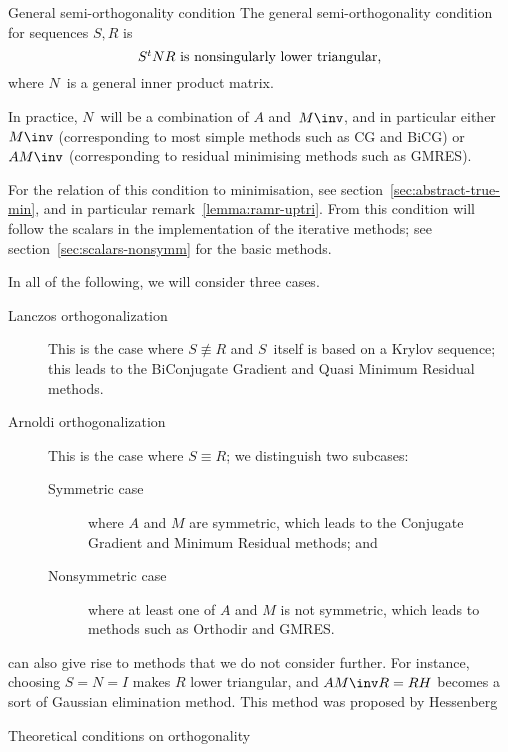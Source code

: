 \documentclass[11pt]{artikel3}
\begin{document}
\begin{Outline}
\begin{ddefinition}{General semi-orthogonality condition}
The general semi-orthogonality condition for sequences $S,R$ is
\begin{equation} \hbox{$S^tN R$ is nonsingularly lower triangular,}
    \label{eq:cond-ortho}\end{equation}
where $N$~is a general inner product matrix.
\end{ddefinition}

In practice, $N$~will be a combination of $A$
and~$M\inv$, and in particular either $M\inv$ (corresponding to
most simple methods such as CG and BiCG) 
or~$AM\inv$ (corresponding to residual minimising methods such as GMRES).

For the relation of this condition to minimisation,
see section~\ref{sec:abstract-true-min}, and in particular 
remark~\ref{lemma:ramr-uptri}. From this condition will follow the
scalars in the implementation of the iterative methods; see
section~\ref{sec:scalars-nonsymm} for the basic methods.

In all of the following, we will consider three cases.
\begin{description}
\item[Lanczos orthogonalization] This is the case where $S\not\equiv R$
and $S$~itself is based on a Krylov sequence;
this leads to the BiConjugate Gradient and Quasi Minimum Residual methods.
\item[Arnoldi orthogonalization] This is the case where $S\equiv R$;
we distinguish two subcases:
\begin{description}
\item[Symmetric case] where $A$ and $M$ are symmetric, 
which leads to the Conjugate Gradient and Minimum Residual methods; and
\item[Nonsymmetric case] where at least one of $A$ and $M$  is not symmetric,
which leads to methods such as Orthodir and GMRES.
\end{description}
\end{description}

\begin{remark}
 can also give rise to methods that we do not
consider further. For instance, choosing $S=N=I$ makes $R$ lower triangular,
and $AM\inv R=RH$ becomes a sort of Gaussian elimination method.
This method was proposed by Hessenberg~\cite{Hessenberg:thesis}
\end{remark}

 {Theoretical conditions on orthogonality}
\label{sec:ortho}


\end{Outline}
\end{document}
